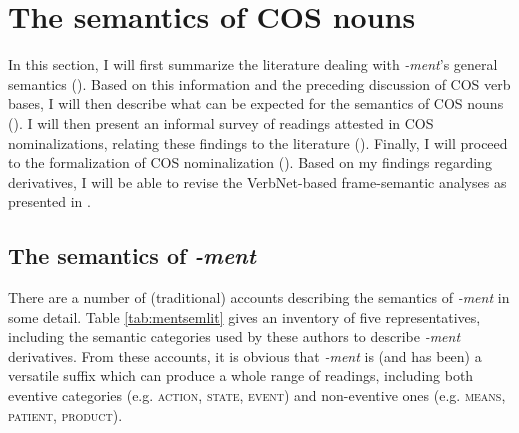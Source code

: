 \section{The semantics of COS nouns}
\label{sec:cos-output}

In this section, I will first summarize the literature dealing with \textit{-ment}'s general semantics (). Based on this information and the preceding discussion of COS verb bases, I will then describe what can be expected for the semantics of COS nouns (). 
I will then present an informal survey of readings attested in COS nominalizations, relating these findings to the literature (). 
Finally, I will proceed to the formalization of COS nominalization (). Based on my findings regarding \ment{} derivatives, I will be able to revise the VerbNet-based frame-semantic analyses as presented in .

\subsection{The semantics of \textit{-ment}}
\label{sec:cos-output-ment}

There are a number of (traditional) accounts describing the semantics of \textit{-ment} in some detail. Table \ref{tab:mentsemlit} gives an inventory of {five} representatives, including the semantic categories used by these authors to describe \textit{-ment} derivatives. From these accounts, it is obvious that \textit{-ment} is (and has been) a versatile suffix which can produce a whole range of readings, including both eventive categories (e.g. \textsc{action, state, event}) and non-eventive ones (e.g. \textsc{means, patient, product}).

